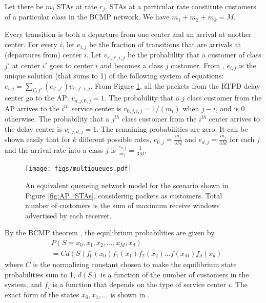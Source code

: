 \documentclass[conference]{IEEEtran}
\begin{document}
Let there be $m_j$ STAs at rate $r_j$. STAs at a particular rate constitute
 customers of a particular class in the BCMP network. We have $m_1 +m_2 + m_k = M$.

Every transition is both a departure from one center and an arrival at another 
center. For every $i$, let $ e_{i,j} $ be the fraction of transitions that are
arrivals at (departures from) center $i$. Let $ v_{i',j',i,j}$  be the 
probability that a customer of class $j'$ at center $i'$  goes to  center $i$ 
and becomes a class $j$ customer. From \cite{astn_model:Wolff}, $ e_{i,j} $  is the
unique solution (that sums to 1) of the following system of equations:
$ e_{i,j} = \sum_{i',j'} (e_{i',j'}) v_{i',j',i,j} $. 
From Figure \ref{fig:threeQs}, all the packets from the RTPD delay center go
to the AP: $v_{d,j,0,j} = 1$. The probability that a $j$ class customer from the
AP arrives to the $i^{th}$ service center is $ v_{0,j,i,j} = 1/(m_i)$ when $j -i $, and is 0 otherwise. 
The probability that a $j^{th}$ class customer from  the $i^{th}$ center arrives
to the delay center is $v_{i,j,d,j}= 1 $. The remaining probabilities are zero. 
It can be shown easily that for $k$ different possible rates,
$e_{0,j} = \frac{m_j}{3M} $ and $ e_{d,j} = \frac{m_j}{3M}$ for each $j$ and  the arrival rate into a class $j$ is $ \frac{ e_{0,j} }{m_j} = \frac{1}{3M} $.

\begin{figure}
\centering
\texttt{[image: figs/multiqueues.pdf]} 
\caption{An equivalent queueing network model for the scenario shown in 
Figure \ref{fig:AP_STAs}, considering packets as customers. Total number
 of customers is the sum of maximum receive windows advertised by each receiver.}
\label{fig:threeQs}
\end{figure}


By the BCMP theorem \cite{astn_model:bcmp}, the equilibrium probabilities
are given by 
\begin{equation}
\begin{split}
& P(S= x_0, x_1, x_2,..., x_M, x_d) \\
& = C d(S)f_0 (x_0) f_1 (x_1) f_2 (x_2)...f(x_M)f_d (x_d)
\end{split}
\label{eq:bcmp_dist}
\end{equation}
where $C$ is the normalizing constant chosen to make the equilibrium state probabilities sum to 1, $d(S)$ is a function of the number of customers in the system, and $f_i$ is a function that depends on the type of service center $i$. The exact form of the states $x_0, x_1, ... $ is shown in \cite{astn_model:bcmp}.
\end{document}
